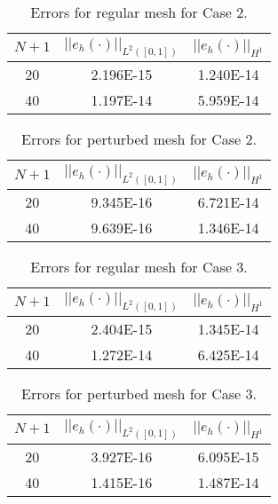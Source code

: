 \documentclass[a4paper, 12pt]{article}
\begin{document}
\begin{table}[!ht]
\caption{Errors for regular mesh for Case 2.}
\vspace{0.1in}
\centering
\begin{tabular}{|c|c|c|}
\hline
 $N+1$&  $||e_h(\cdot)||_{L^2([0,1])}$ & $||e_h(\cdot)||_{H^1}$ \\
 \hline
     20  & 2.196E-15 & 1.240E-14 \\
     40  & 1.197E-14 & 5.959E-14 \\
\hline
\end{tabular}
\label{tab:C2o}
\end{table}

\begin{table}[!ht]
\caption{Errors for perturbed mesh for Case 2.}
\vspace{0.1in}
\centering
\begin{tabular}{|c|c|c|}
\hline
 $N+1$  & $||e_h(\cdot)||_{L^2([0,1])}$ & $||e_h(\cdot)||_{H^1}$ \\
 \hline
     20  & 9.345E-16 & 6.721E-14 \\
     40  & 9.639E-16 & 1.346E-14 \\
\hline
\end{tabular}
\label{tab:C2p}
\end{table}

\begin{table}[!ht]
\caption{Errors for regular mesh for Case 3.}
\vspace{0.1in}
\centering
\begin{tabular}{|c|c|c|}
\hline
 $N+1$&  $||e_h(\cdot)||_{L^2([0,1])}$ & $||e_h(\cdot)||_{H^1}$ \\
 \hline
     20  & 2.404E-15 & 1.345E-14 \\
     40  & 1.272E-14 & 6.425E-14 \\
\hline
\end{tabular}
\label{tab:C3o}
\end{table}

\begin{table}[!ht]
\caption{Errors for perturbed mesh for Case 3.}
\vspace{0.1in}
\centering
\begin{tabular}{|c|c|c|}
\hline
 $N+1$  & $||e_h(\cdot)||_{L^2([0,1])}$ & $||e_h(\cdot)||_{H^1}$ \\
 \hline
     20  & 3.927E-16 & 6.095E-15 \\
     40  & 1.415E-16 & 1.487E-14 \\
\hline
\end{tabular}
\label{tab:C3p}
\end{table}
\end{document}
